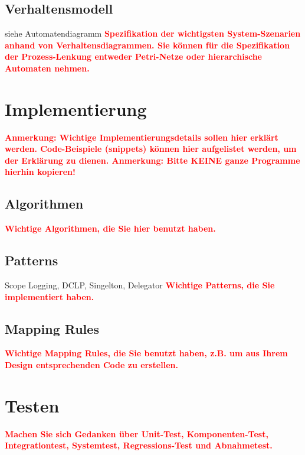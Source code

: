 \documentclass[oneside,a4paper,titlepage]{scrartcl} %
\begin{document}
\subsection{Verhaltensmodell}
siehe Automatendiagramm \newline
\textcolor{red}{\textbf{Spezifikation der wichtigsten System-Szenarien anhand von Verhaltensdiagrammen.
Sie können für die Spezifikation der Prozess-Lenkung entweder Petri-Netze oder hierarchische Automaten nehmen.}}

\newpage

\section{Implementierung}
\textcolor{red}{\textbf{Anmerkung: Wichtige Implementierungsdetails sollen hier erklärt werden.
Code-Beispiele (snippets) können hier aufgelistet werden, um der Erklärung zu dienen.
Anmerkung: Bitte KEINE ganze Programme hierhin kopieren!}}

\subsection{Algorithmen}
\textcolor{red}{\textbf{Wichtige Algorithmen, die Sie hier benutzt haben.}}

\subsection{Patterns}
Scope Logging, DCLP, Singelton, Delegator \newline
\textcolor{red}{\textbf{Wichtige Patterns, die Sie implementiert haben.}}

\subsection{Mapping Rules}
\textcolor{red}{\textbf{Wichtige Mapping Rules, die Sie benutzt haben, z.B.
um aus Ihrem Design entsprechenden Code zu erstellen.}}

\newpage

\section{Testen}
\textcolor{red}{\textbf{Machen Sie sich Gedanken über Unit-Test, Komponenten-Test,
Integrationtest, Systemtest, Regressions-Test und Abnahmetest.}}
\end{document}
